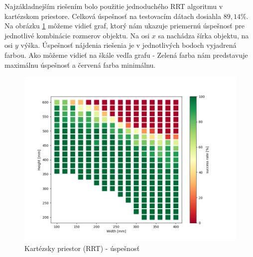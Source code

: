 Najzákladnejším riešením bolo použitie jednoduchého RRT algoritmu v kartézskom priestore. Celková úspešnosť na testovacím dátach dosiahla $ 89,14 \% $. Na obrázku \ref{OBRAZOK 5.1.1} môžeme vidieť graf, ktorý nám ukazuje priemernú úspešnosť pre jednotlivé kombinácie rozmerov objektu. Na osi $ x $ sa nachádza šírka objektu, na osi $ y $ výška. Úspešnosť nájdenia riešenia je v jednotlivých bodoch vyjadrená farbou. Ako môžeme vidieť na škále vedľa grafu - Zelená farba nám predstavuje maximálnu úspešnosť a červená farba minimálnu.
\begin{figure}[h!]
	\centering
	\includegraphics[width=140mm]{img/XYA-size.png}
	\caption{Kartézsky priestor (RRT) - úspešnosť } \label{OBRAZOK 5.1.1} 
\end{figure} 

